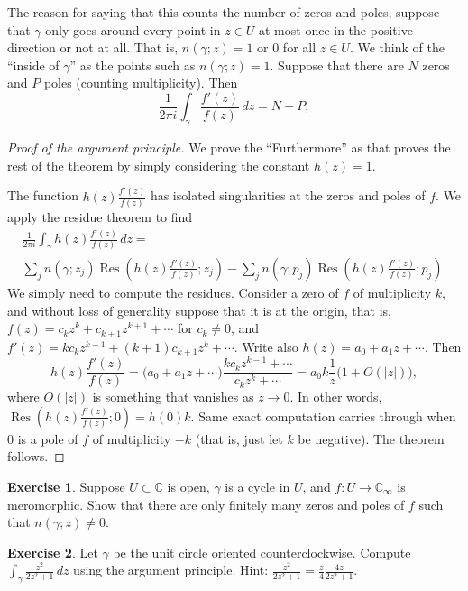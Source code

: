\documentclass[12pt,openany]{book}
\newcommand{\sabs}[1]{\lvert {#1} \rvert}
\newcommand{\C}{{\mathbb{C}}}
\theoremstyle{plain}
\theoremstyle{remark}
\theoremstyle{definition}
\newenvironment{exbox}{%
    \def\FrameCommand{\vrule width 1pt \relax\hspace{10pt}}%
    \MakeFramed{\advance\hsize-\width\FrameRestore}%
}{%
    \endMakeFramed
}
\theoremstyle{exercise}
\newtheorem{exercise}{Exercise}[section]
\theoremstyle{example}
\begin{document}
The reason for saying that this counts the number of zeros and poles,
suppose that $\gamma$ only goes around every point in $z \in U$ at most once
in the positive direction or not at all.  That is,
$n(\gamma;z) = 1$ or $0$ for all $z \in U$.  We think of the ``inside of
$\gamma$'' as the points such as $n(\gamma;z)=1$.  Suppose that there are
$N$ zeros and $P$ poles (counting multiplicity).  Then
\begin{equation*}
\frac{1}{2\pi i}
\int_\gamma \frac{f'(z)}{f(z)} \, dz
= N - P ,
\end{equation*}

\begin{proof}[Proof of the argument principle]
We prove the ``Furthermore'' as that proves the rest of the theorem by
simply considering the constant $h(z) = 1$.

The function $h(z) \frac{f'(z)}{f(z)}$ has isolated singularities
at the zeros and poles of $f$.  We apply the residue theorem to find
\begin{multline*}
\frac{1}{2\pi i}
\int_\gamma h(z) \frac{f'(z)}{f(z)} \, dz
=
\\
\sum_{j} n(\gamma;z_j)\operatorname{Res}\left(h(z)
\frac{f'(z)}{f(z)};z_j\right)
-
\sum_{j} n(\gamma;p_j)\operatorname{Res}\left(h(z)
\frac{f'(z)}{f(z)};p_j\right) .
\end{multline*}
We simply need to compute the residues.  Consider a zero of $f$ of
multiplicity $k$, and
without loss of generality suppose that it is at the origin,
that is, $f(z) = c_k z^k + c_{k+1} z^{k+1} + \cdots$ for $c_k \not= 0$, and 
$f'(z) = k c_k z^{k-1} + (k+1)c_{k+1} z^{k} + \cdots$.
Write also $h(z) = a_0 + a_1 z + \cdots$.  Then
\begin{equation*}
h(z)
\frac{f'(z)}{f(z)}
=
\bigl(
a_0 + a_1 z + \cdots
\bigr)
\frac{k c_k z^{k-1} + \cdots}{c_k z^k + \cdots}
=
a_0 k \frac{1}{z} \bigl( 1 + O(\sabs{z}) \bigr) ,
\end{equation*}
where $O(\sabs{z})$ is something that vanishes as $z \to 0$.
In other words, $\operatorname{Res}\left(h(z)
\frac{f'(z)}{f(z)};0\right) = h(0) k$.
Same exact computation carries through when $0$ is a pole of $f$
of multiplicity $-k$ (that is, just let $k$ be negative).
The theorem follows.
\end{proof}

\begin{exbox}
\begin{exercise}
Suppose $U \subset \C$ is open, $\gamma$ is a cycle in $U$,
and $f \colon U \to \C_\infty$ is meromorphic.
Show that there are only finitely many zeros and poles of $f$
such that $n(\gamma;z) \not= 0$.
\end{exercise}

\begin{exercise}
Let $\gamma$ be the unit circle oriented counterclockwise.
Compute $\int_\gamma \frac{z^2}{2 z^2+1} \, dz$ using the argument
principle.  Hint: $\frac{z^2}{2 z^2+1}=\frac{z}{4} \frac{4z}{2z^2+1}$.
\end{exercise}
\end{exbox}
\end{document}
